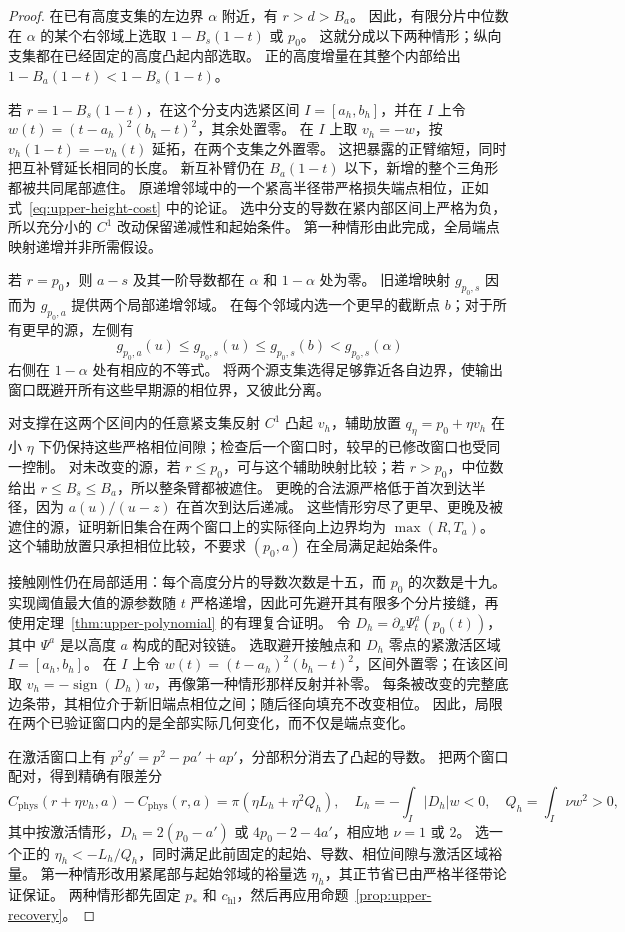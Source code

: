 \begin{proof}
在已有高度支集的左边界 $\alpha$ 附近，有 $r>d>B_a$。
因此，有限分片中位数在 $\alpha$ 的某个右邻域上选取 $1-B_s(1-t)$ 或 $p_0$。
这就分成以下两种情形；纵向支集都在已经固定的高度凸起内部选取。
正的高度增量在其整个内部给出 $1-B_a(1-t)<1-B_s(1-t)$。

若 $r=1-B_s(1-t)$，在这个分支内选紧区间 $I=[a_h,b_h]$，并在 $I$ 上令 $w(t)=(t-a_h)^2(b_h-t)^2$，其余处置零。
在 $I$ 上取 $v_h=-w$，按 $v_h(1-t)=-v_h(t)$ 延拓，在两个支集之外置零。
这把暴露的正臂缩短，同时把互补臂延长相同的长度。
新互补臂仍在 $B_a(1-t)$ 以下，新增的整个三角形都被共同尾部遮住。
原递增邻域中的一个紧高半径带严格损失端点相位，正如式~\eqref{eq:upper-height-cost} 中的论证。
选中分支的导数在紧内部区间上严格为负，所以充分小的 $C^1$ 改动保留递减性和起始条件。
第一种情形由此完成，全局端点映射递增并非所需假设。

若 $r=p_0$，则 $a-s$ 及其一阶导数都在 $\alpha$ 和 $1-\alpha$ 处为零。
旧递增映射 $g_{p_0,s}$ 因而为 $g_{p_0,a}$ 提供两个局部递增邻域。
在每个邻域内选一个更早的截断点 $b$；对于所有更早的源，左侧有
\[
 g_{p_0,a}(u)\le g_{p_0,s}(u)\le g_{p_0,s}(b)
                          <g_{p_0,s}(\alpha)
\]
右侧在 $1-\alpha$ 处有相应的不等式。
将两个源支集选得足够靠近各自边界，使输出窗口既避开所有这些早期源的相位界，又彼此分离。

对支撑在这两个区间内的任意紧支集反射 $C^1$ 凸起 $v_h$，辅助放置 $q_\eta=p_0+\eta v_h$ 在小 $\eta$ 下仍保持这些严格相位间隙；检查后一个窗口时，较早的已修改窗口也受同一控制。
对未改变的源，若 $r\le p_0$，可与这个辅助映射比较；若 $r>p_0$，中位数给出 $r\le B_s\le B_a$，所以整条臂都被遮住。
更晚的合法源严格低于首次到达半径，因为 $a(u)/(u-z)$ 在首次到达后递减。
这些情形穷尽了更早、更晚及被遮住的源，证明新旧集合在两个窗口上的实际径向上边界均为 $\max(R,T_a)$。
这个辅助放置只承担相位比较，不要求 $(p_0,a)$ 在全局满足起始条件。

接触刚性仍在局部适用：每个高度分片的导数次数是十五，而 $p_0$ 的次数是十九。
实现阈值最大值的源参数随 $t$ 严格递增，因此可先避开其有限多个分片接缝，再使用定理~\ref{thm:upper-polynomial} 的有理复合证明。
令 $D_h=\partial_x\Psi^{a}_t(p_0(t))$，其中 $\Psi^{a}$ 是以高度 $a$ 构成的配对铰链。
选取避开接触点和 $D_h$ 零点的紧激活区域 $I=[a_h,b_h]$。
在 $I$ 上令 $w(t)=(t-a_h)^2(b_h-t)^2$，区间外置零；在该区间取 $v_h=-\operatorname{sign}(D_h)w$，再像第一种情形那样反射并补零。
每条被改变的完整底边条带，其相位介于新旧端点相位之间；随后径向填充不改变相位。
因此，局限在两个已验证窗口内的是全部实际几何变化，而不仅是端点变化。

在激活窗口上有 $p^2g'=p^2-pa'+ap'$，分部积分消去了凸起的导数。
把两个窗口配对，得到精确有限差分
\[
 C_{\mathrm{phys}}(r+\eta v_h,a)-C_{\mathrm{phys}}(r,a)
  =\pi(\eta L_h+\eta^2Q_h),\quad
 L_h=-\int_I|D_h|w<0,\quad Q_h=\int_I\nu w^2>0,
\]
其中按激活情形，$D_h=2(p_0-a')$ 或 $4p_0-2-4a'$，相应地 $\nu=1$ 或 $2$。
选一个正的 $\eta_h<-L_h/Q_h$，同时满足此前固定的起始、导数、相位间隙与激活区域裕量。
第一种情形改用紧尾部与起始邻域的裕量选 $\eta_h$，其正节省已由严格半径带论证保证。
两种情形都先固定 $p_*$ 和 $c_{\mathrm{hl}}$，然后再应用命题~\ref{prop:upper-recovery}。
\end{proof}

